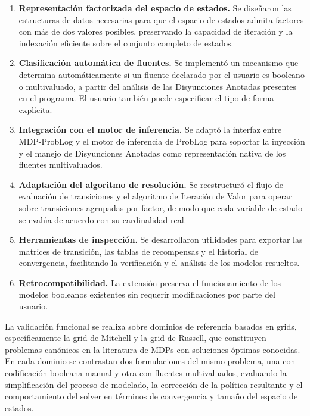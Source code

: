 \begin{enumerate}
    \item \textbf{Representación factorizada del espacio de estados.}
    Se diseñaron las estructuras de datos necesarias para que el espacio
    de estados admita factores con más de dos valores posibles, preservando
    la capacidad de iteración y la indexación eficiente sobre el conjunto
    completo de estados.

    \item \textbf{Clasificación automática de fluentes.} Se implementó un
    mecanismo que determina automáticamente si un fluente declarado por el
    usuario es booleano o multivaluado, a partir del análisis de las
    Disyunciones Anotadas presentes en el programa. El usuario también
    puede especificar el tipo de forma explícita.

    \item \textbf{Integración con el motor de inferencia.} Se adaptó la
    interfaz entre MDP-ProbLog y el motor de inferencia de ProbLog para
    soportar la inyección y el manejo de Disyunciones Anotadas como
    representación nativa de los fluentes multivaluados.

    \item \textbf{Adaptación del algoritmo de resolución.} Se reestructuró
    el flujo de evaluación de transiciones y el algoritmo de Iteración de
    Valor para operar sobre transiciones agrupadas por factor, de modo que
    cada variable de estado se evalúa de acuerdo con su cardinalidad real.

    \item \textbf{Herramientas de inspección.} Se desarrollaron utilidades
    para exportar las matrices de transición, las tablas de recompensas y
    el historial de convergencia, facilitando la verificación y el análisis
    de los modelos resueltos.

    \item \textbf{Retrocompatibilidad.} La extensión preserva el
    funcionamiento de los modelos booleanos existentes sin requerir
    modificaciones por parte del usuario.
\end{enumerate}

La validación funcional se realiza sobre dominios de referencia basados en
grids, específicamente la grid de Mitchell y la grid de Russell, que
constituyen problemas canónicos en la literatura de MDPs con soluciones
óptimas conocidas. En cada dominio se contrastan dos formulaciones del
mismo problema, una con codificación booleana manual y otra con fluentes
multivaluados, evaluando la simplificación del proceso de modelado, la
corrección de la política resultante y el comportamiento del solver en
términos de convergencia y tamaño del espacio de estados.

